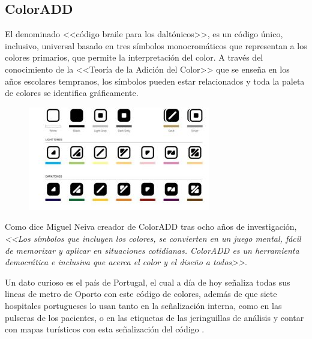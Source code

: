 \documentclass[10pt]{article}
\begin{document}
\subsection{ColorADD}

El denominado <<código braile para los daltónicos>>, es un código único, inclusivo, universal basado en tres símbolos monocromáticos que representan a los colores primarios, que permite la interpretación del color. A través del conocimiento de la <<Teoría de la Adición del Color>> que se enseña en los años escolares tempranos, los símbolos pueden estar relacionados y toda la paleta de colores se identifica gráficamente\cite{IEEEreferencias:Ref17}.
\newline
\begin{figure}[H]
	\begin{center}
\includegraphics[scale = 0.85]{Imagenes/1437744306_549219_1437997332_sumario_normal.jpg}
	\end{center} 
\end{figure}

Como dice Miguel Neiva creador de ColorADD tras ocho años de investigación, \textit{<<Los símbolos que incluyen los colores, se convierten en un juego mental, fácil de memorizar y aplicar en situaciones cotidianas. ColorADD es un herramienta democrática e inclusiva que acerca el color y el diseño a todos>>}\cite{IEEEreferencias:Ref17}. \newline

Un dato curioso es el país de Portugal, el cual a día de hoy señaliza todas sus lineas de metro de Oporto con este código de colores, además de que siete hospitales portugueses lo usan tanto en la señalización interna, como en las pulseras de los pacientes, o en las etiquetas de las jeringuillas de análisis y contar con mapas turísticos con esta señalización del código \cite{IEEEreferencias:Ref17}.
\end{document}
